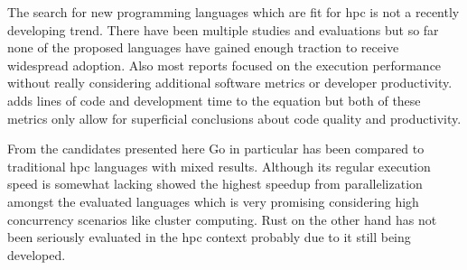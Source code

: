 The search for new programming languages which are fit for \gls{hpc} is not a recently developing trend. There have been multiple studies and evaluations but so far none of the proposed languages have gained enough traction to receive widespread adoption. Also most reports focused on the execution performance without really considering additional software metrics or developer productivity. \cite{related_multicore} adds lines of code and development time to the equation but both of these metrics only allow for superficial conclusions about code quality and productivity.

From the candidates presented here Go in particular has been compared to traditional \gls{hpc} languages with mixed results. Although its regular execution speed is somewhat lacking \cite{related_sor_study} showed the highest speedup from parallelization amongst the evaluated languages which is very promising considering high concurrency scenarios like cluster computing. Rust on the other hand has not been seriously evaluated in the \gls{hpc} context probably due to it still being developed.
